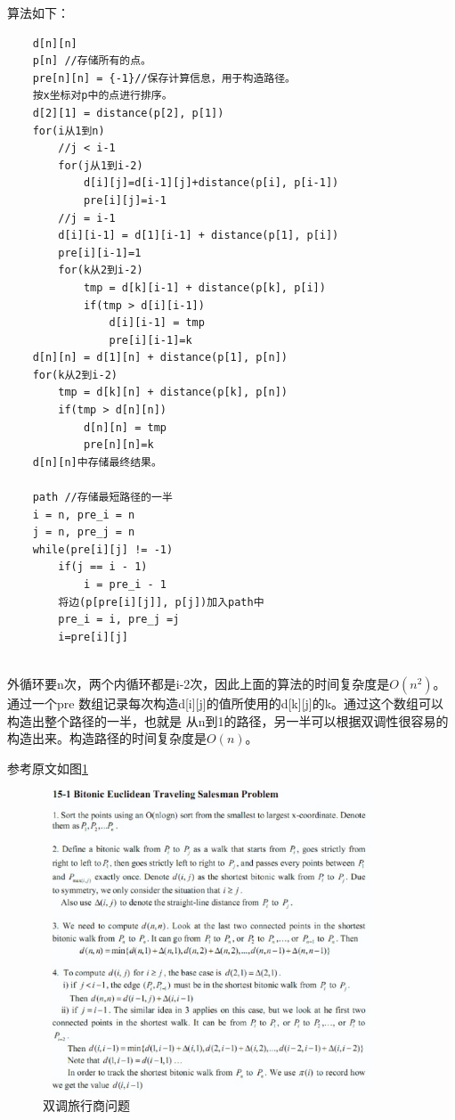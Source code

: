 \documentclass[a4paper, 11pt]{article}
\begin{document}
	算法如下：
\begin{verbatim}
    d[n][n]
    p[n] //存储所有的点。
    pre[n][n] = {-1}//保存计算信息，用于构造路径。
    按x坐标对p中的点进行排序。
    d[2][1] = distance(p[2], p[1])
    for(i从1到n)
        //j < i-1
        for(j从1到i-2)
            d[i][j]=d[i-1][j]+distance(p[i], p[i-1])
            pre[i][j]=i-1
        //j = i-1
        d[i][i-1] = d[1][i-1] + distance(p[1], p[i])
        pre[i][i-1]=1
        for(k从2到i-2)
            tmp = d[k][i-1] + distance(p[k], p[i])
            if(tmp > d[i][i-1])
                d[i][i-1] = tmp
                pre[i][i-1]=k
    d[n][n] = d[1][n] + distance(p[1], p[n])
    for(k从2到i-2)
        tmp = d[k][n] + distance(p[k], p[n])
        if(tmp > d[n][n])
            d[n][n] = tmp
            pre[n][n]=k
    d[n][n]中存储最终结果。
    
    path //存储最短路径的一半
    i = n, pre_i = n
    j = n, pre_j = n
    while(pre[i][j] != -1)
        if(j == i - 1)
            i = pre_i - 1
        将边(p[pre[i][j]], p[j])加入path中
        pre_i = i, pre_j =j
        i=pre[i][j]
    
\end{verbatim}
	外循环要n次，两个内循环都是i-2次，因此上面的算法的时间复杂度是$O(n^2)$。通过一个pre
数组记录每次构造d[i][j]的值所使用的d[k][j]的k。通过这个数组可以构造出整个路径的一半，也就是
从n到1的路径，另一半可以根据双调性很容易的构造出来。构造路径的时间复杂度是$O(n)$。
	
	参考原文如图\ref{btsp}
\begin{figure}[htbp]
\centering
\caption{双调旅行商问题}
\label{btsp}
\includegraphics[height=9cm, width=10cm]{btsp.eps}
\end{figure}
\end{document}
